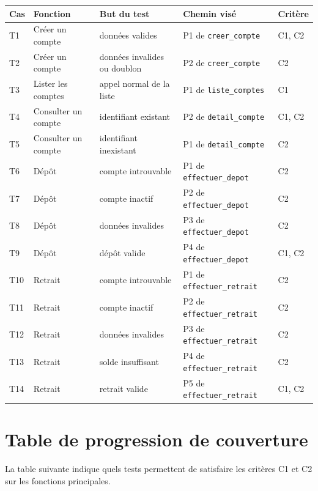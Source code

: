 \documentclass[11pt,a4paper]{article}
\begin{document}
\begin{longtable}{|P{1.8cm}|P{4cm}|P{4.8cm}|P{3.5cm}|P{2cm}|}
\hline
{}
\textbf{Cas} & \textbf{Fonction} & \textbf{But du test} & \textbf{Chemin visé} & \textbf{Critère} \\
\hline
T1 & Créer un compte & données valides & P1 de \texttt{creer\_compte} & C1, C2 \\
\hline
T2 & Créer un compte & données invalides ou doublon & P2 de \texttt{creer\_compte} & C2 \\
\hline
T3 & Lister les comptes & appel normal de la liste & P1 de \texttt{liste\_comptes} & C1 \\
\hline
T4 & Consulter un compte & identifiant existant & P2 de \texttt{detail\_compte} & C1, C2 \\
\hline
T5 & Consulter un compte & identifiant inexistant & P1 de \texttt{detail\_compte} & C2 \\
\hline
T6 & Dépôt & compte introuvable & P1 de \texttt{effectuer\_depot} & C2 \\
\hline
T7 & Dépôt & compte inactif & P2 de \texttt{effectuer\_depot} & C2 \\
\hline
T8 & Dépôt & données invalides & P3 de \texttt{effectuer\_depot} & C2 \\
\hline
T9 & Dépôt & dépôt valide & P4 de \texttt{effectuer\_depot} & C1, C2 \\
\hline
T10 & Retrait & compte introuvable & P1 de \texttt{effectuer\_retrait} & C2 \\
\hline
T11 & Retrait & compte inactif & P2 de \texttt{effectuer\_retrait} & C2 \\
\hline
T12 & Retrait & données invalides & P3 de \texttt{effectuer\_retrait} & C2 \\
\hline
T13 & Retrait & solde insuffisant & P4 de \texttt{effectuer\_retrait} & C2 \\
\hline
T14 & Retrait & retrait valide & P5 de \texttt{effectuer\_retrait} & C1, C2 \\
\hline
\end{longtable}

\section{Table de progression de couverture}

La table suivante indique quels tests permettent de satisfaire les critères C1 et C2 sur les fonctions principales.
\end{document}
